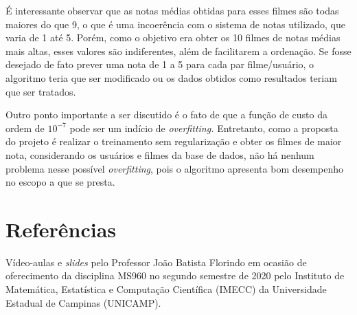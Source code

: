 \documentclass[12pt]{article}
\begin{document}
É interessante observar que as notas médias obtidas para esses filmes são todas maiores do que 9, o que é uma incoerência com o sistema de notas utilizado, que varia de 1 até 5. Porém, como o objetivo era obter os 10 filmes de notas médias mais altas, esses valores são indiferentes, além de facilitarem a ordenação. Se fosse desejado de fato prever uma nota de 1 a 5 para cada par filme/usuário, o algoritmo teria que ser modificado ou os dados obtidos como resultados teriam que ser tratados.

Outro ponto importante a ser discutido é o fato de que a função de custo da ordem de $10^{-7}$ pode ser um indício de \textit{overfitting.} Entretanto, como a proposta do projeto é realizar o treinamento sem regularização e obter os filmes de maior nota, considerando os usuários e filmes da base de dados, não há nenhum problema nesse possível \textit{overfitting}, pois o algoritmo apresenta bom desempenho no escopo a que se presta.

\section{Referências}
Vídeo-aulas e \textit{slides} pelo Professor João Batista Florindo em ocasião de oferecimento da disciplina MS960 no segundo semestre de 2020 pelo Instituto de Matemática, Estatística e Computação Científica (IMECC) da Universidade Estadual de Campinas (UNICAMP).
\end{document}
